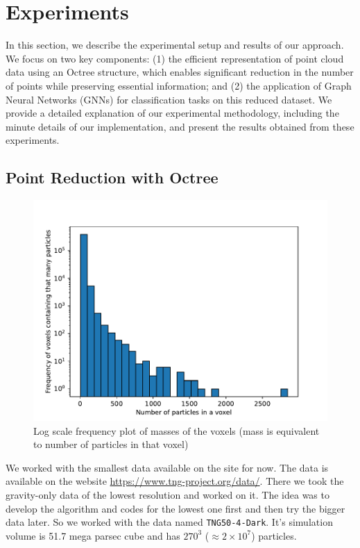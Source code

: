 \section{Experiments}

In this section, we describe the experimental setup and results of our approach. We focus on two key components: (1) the efficient representation of point cloud data using an Octree structure, which enables significant reduction in the number of points while preserving essential information; and (2) the application of Graph Neural Networks (GNNs) for classification tasks on this reduced dataset. We provide a detailed explanation of our experimental methodology, including the minute details of our implementation, and present the results obtained from these experiments.

\subsection{Point Reduction with Octree}\label{ssec:expt_octree}
    \begin{figure}
        \centering
        \includegraphics[width=\linewidth]{images/g1.pdf}
        \caption{Log scale frequency plot of masses of the voxels (mass is equivalent to number of particles in that voxel)}
        \label{graph:1}
    \end{figure}

    We worked with the smallest data available on the site for now. The data is available on the website \url{https://www.tng-project.org/data/}. There we took the gravity-only data of the lowest resolution and worked on it. The idea was to develop the algorithm and codes for the lowest one first and then try the bigger data later. So we worked with the data named \texttt{TNG50-4-Dark}. It's simulation volume is 51.7 mega parsec cube and has $270^3$ ($\approx2\times10^7$) particles.

